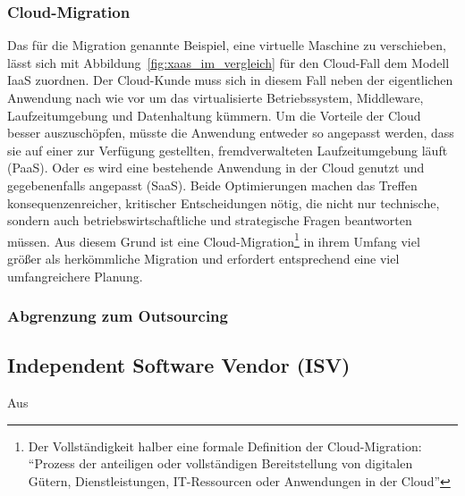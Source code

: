 \subsubsection{Cloud-Migration}
Das für die Migration genannte Beispiel, eine virtuelle Maschine zu 
verschieben, lässt sich mit Abbildung~\ref{fig:xaas_im_vergleich} für den 
Cloud-Fall dem Modell IaaS zuordnen. Der Cloud-Kunde muss sich in diesem Fall 
neben der eigentlichen Anwendung nach wie vor um das virtualisierte 
Betriebssystem, Middleware, Laufzeitumgebung und Datenhaltung kümmern. Um die 
Vorteile der Cloud besser auszuschöpfen, müsste die Anwendung entweder so 
angepasst werden, dass sie auf einer zur Verfügung gestellten, fremdverwalteten 
Laufzeitumgebung läuft (PaaS). Oder es wird eine bestehende Anwendung in der 
Cloud genutzt und gegebenenfalls angepasst (SaaS). Beide Optimierungen 
machen das Treffen konsequenzenreicher, kritischer Entscheidungen nötig, 
die nicht nur technische, sondern auch betriebswirtschaftliche und strategische 
Fragen beantworten müssen.  
Aus diesem Grund ist eine Cloud-Migration\footnote{Der Vollständigkeit halber 
eine formale Definition der Cloud-Migration: "`Prozess der anteiligen 
oder 
vollständigen Bereitstellung von digitalen Gütern, Dienstleistungen, 
IT-Ressourcen oder Anwendungen in der Cloud"'} 
 in ihrem Umfang viel größer als 
herkömmliche Migration und erfordert entsprechend eine viel umfangreichere 
Planung. 

\subsubsection{Abgrenzung zum Outsourcing}

\subsection{Independent Software Vendor (ISV)}
\label{cha:isv}

Aus  
